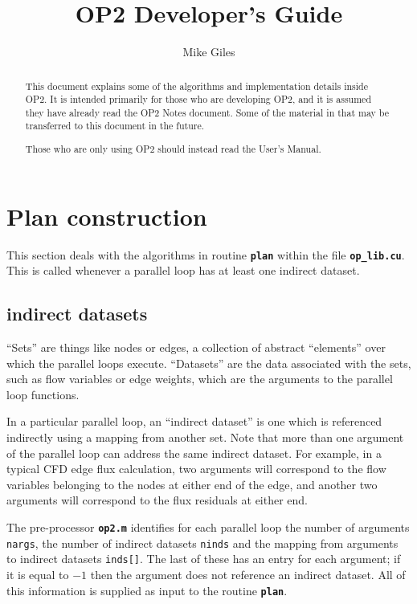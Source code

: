 \documentclass[12pt]{article}
\begin{document}
\title{OP2 Developer's Guide}
\author{Mike Giles}


\maketitle

\begin{abstract}
This document explains some of the algorithms and implementation
details inside OP2.  It is intended primarily for those who are
developing OP2, and it is assumed they have already read the OP2 
Notes document.  Some of the material in that may be transferred
to this document in the future.

Those who are only using OP2 should instead read the User's Manual.  
\end{abstract}

\section{Plan construction}

This section deals with the algorithms in routine {\tt \bf plan} 
within the file {\tt \bf op\_lib.cu}.  This is called whenever a
parallel loop has at least one indirect dataset.

\subsection{indirect datasets}

``Sets'' are things like nodes or edges, a collection of abstract 
``elements'' over which the parallel loops execute.
``Datasets'' are the data associated with the sets, such as flow 
variables or edge weights, which are the arguments to the parallel 
loop functions.

In a particular parallel loop, an ``indirect dataset'' is one which 
is referenced indirectly using a mapping from another set.  Note that 
more than one argument of the parallel loop can address the same 
indirect dataset.  For example, in a typical CFD edge flux calculation, 
two arguments will correspond to the flow variables belonging to the 
nodes at either end of the edge, and another two arguments will 
correspond to the flux residuals at either end.

The pre-processor {\tt \bf op2.m} identifies for each parallel loop
the number of arguments {\tt nargs}, the number of indirect datasets
{\tt ninds} and the mapping from arguments to indirect datasets 
{\tt inds[]}.   The last of these has an entry for each argument; 
if it is equal to $-1$ then the argument does not reference an 
indirect dataset.
All of this information is supplied as input to the routine 
{\tt \bf plan}.
\end{document}
